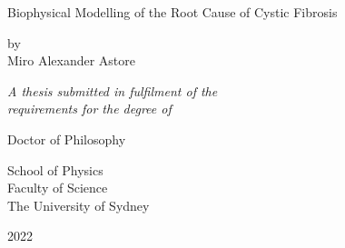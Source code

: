 
\begin{titlepage}

\begin{center}

\vspace*{0.1in}

\begin{LARGE}
Biophysical Modelling of the Root Cause of Cystic Fibrosis 
\end{LARGE}

\vspace{1.0in}
\begin{large}
by\\
\vspace{0.3in}
Miro Alexander Astore
\vspace{1.0in}

\textit{A thesis submitted in fulfilment of the}\\
\textit{requirements for the degree of}

\vspace{0.6in}

Doctor of Philosophy

\vspace{1.0in}

School of Physics\\
Faculty of Science\\
\vspace{0.05in}
The University of Sydney

\vspace{1.0in}

2022
\end{large}

\end{center}
\end{titlepage}
